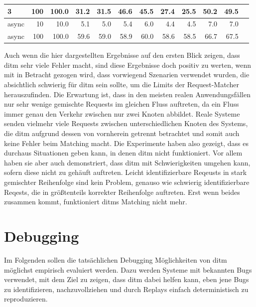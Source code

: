 \documentclass[12pt,a4paper]{report}
\begin{document}
\begin{table}[H]
\begin{tabular}{|l|r|r|r|r|r|r|r|r|r|r|r|}
		3                        & 100                                & 100.0                           & 31.2                        & 31.5                      & 46.6                           & 45.5 & 27.4 & 25.5 & 50.2 & 49.5 \\ \hline
		async                    & 10                                 & 10.0                            & 5.1                         & 5.0                       & 5.4                            & 6.0  & 4.4  & 4.5  & 7.0  & 7.0  \\ \hline
		async                    & 100                                & 100.0                           & 59.6                        & 59.0                      & 58.9                           & 60.0 & 58.6 & 58.5 & 66.7 & 67.5 \\ \hline
	\end{tabular}
\end{table}

Auch wenn die hier dargestellten Ergebnisse auf den ersten Blick zeigen, dass ditm sehr viele Fehler macht, sind diese Ergebnisse
doch positiv zu werten, wenn mit in Betracht gezogen wird, dass vorwiegend Szenarien verwendet wurden, die absichtlich schwierig
für ditm sein sollte, um die Limits der Request-Matcher herauszufinden. Die Erwartung ist, dass in den meisten realen Anwendungsfällen
nur sehr wenige gemischte Requests im gleichen Fluss auftreten, da ein Fluss immer genau den Verkehr zwischen nur zwei Knoten
abbildet. Reale Systeme senden vielmehr viele Requests zwischen unterschiedlichen Knoten des Systems, die ditm aufgrund
dessen von vornherein getrennt betrachtet und somit auch keine Fehler beim Matching macht. Die Experimente haben also gezeigt,
dass es durchaus Situationen geben kann, in denen ditm nicht funktioniert. Vor allem haben sie aber auch demonstriert, dass ditm
mit Schwierigkeiten umgehen kann, sofern diese nicht zu gehäuft auftreten. Leicht identifizierbare Reqeusts in stark gemischter
Reihenfolge sind kein Problem, genauso wie schwierig identifizierbare Reqests, die in größtenteils korrekter Reihenfolge
auftreten. Erst wenn beides zusammen kommt, funktioniert ditms Matching nicht mehr.

\section{Debugging}
Im Folgenden sollen die tatsächlichen Debugging Möglichkeiten von ditm möglichst empirisch evaluiert werden. Dazu werden Systeme mit
bekannten Bugs verwendet, mit dem Ziel zu zeigen, dass ditm dabei helfen kann, eben jene Bugs zu identifizieren, nachzuvollziehen
und durch Replays einfach deterministisch zu reproduzieren.
\end{document}
